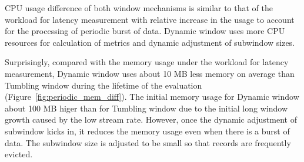 CPU usage difference of both window mechanisms is similar to that of the workload for latency measurement with relative increase 
in the usage to account for the processing of periodic burst of data. Dynamic window uses more CPU resources for 
calculation of metrics and dynamic adjustment of subwindow sizes. 

Surprisingly, compared with the memory usage under the workload for latency measurement, Dynamic window uses 
about 10 MB less memory on average than Tumbling window during the lifetime of the evaluation (Figure~\ref{fig:periodic_mem_diff}). 
The initial memory usage for Dynamic window about 100 MB higer than for Tumbling window due to the initial long window growth 
caused by the low stream rate. However, once 
the dynamic adjustment of subwindow kicks in, it reduces the memory usage even when there is a burst of data. The subwindow size
is adjusted to be small so that records are frequently evicted. 


